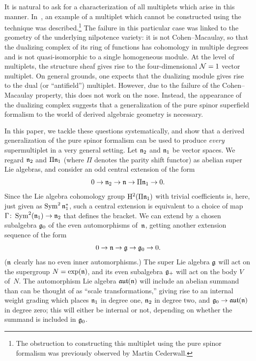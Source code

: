 \documentclass[pdftex]{sigma}
\numberwithin{equation}{section}
\def\lie#1{\ensuremath{\mathfrak{#1}}}
\def\aut{\ensuremath{\lie{aut}}}
\DeclareMathOperator{\Sym}{Sym}
\begin{document}
It is natural to ask for a characterization of all multiplets which arise in this manner.
In~\cite{perspectives}, an example of a multiplet which cannot be constructed using the technique was described.\footnote{The obstruction to constructing this multiplet using the pure spinor formalism was previously observed by Martin Cederwall.} The failure in this particular case was linked to the geometry of the underlying nilpotence variety: it is not Cohen--Macaulay, so that the dualizing complex of its ring of functions has cohomology in multiple degrees and is not quasi-isomorphic to a single homogeneous module. At the level of multiplets, the structure sheaf gives rise to the four-dimensional $\mathcal N = 1$ vector multiplet. On general grounds, one expects that the dualizing module gives rise to
the dual (or ``antifield'') multiplet.
However, due to the failure of the Cohen--Macaulay property, this does not work on the nose. Instead, the appearance of the dualizing complex suggests that a generalization of the pure spinor superfield formalism to the world of derived algebraic geometry is necessary.

In this paper, we tackle these questions systematically, and show that a derived generalization of the pure spinor formalism can be used to produce \emph{every} supermultiplet in a very general setting.
Let $\mathfrak n_2$ and $\mathfrak n_1$ be vector spaces. We regard $\mathfrak n_2$ and $\Pi \mathfrak n_1$ (where $\Pi$ denotes the parity shift functor) as abelian super Lie algebras, and consider an odd central extension of the form
\begin{equation} \label{eq:ext1}
	0 \to \mathfrak n_2 \to \mathfrak n \to \Pi\mathfrak n_1 \to 0.
\end{equation}
Since the Lie algebra cohomology group $\mathrm H^2(\Pi \mathfrak n_1)$ with trivial coefficients is, here, just given as $\Sym^2 \fn_1^*$, such a central extension is equivalent to a choice of map $\Gamma \colon \Sym^2(\fn_1) \to \fn_2$ that defines the bracket.
We can extend by a chosen subalgebra $\mathfrak g_0$ of the even automorphisms of~$\mathfrak n$, getting another extension sequence of the form
\begin{equation*}
	0 \to \mathfrak n \to \mathfrak g \to \mathfrak g_0 \to 0.
\end{equation*}
($\mathfrak n$ clearly has no even inner automorphisms.) The super Lie algebra $\mathfrak g$ will act on the supergroup $N = \exp(\mathfrak n)$, and its even subalgebra $\mathfrak g_+$ will act on the body $V$ of~$N$. The automorphism Lie algebra $\aut(\fn)$ will include an abelian summand than can be thought of as ``scale transformations,'' giving rise to an internal weight grading which places $\mathfrak n_1$ in degree one, $\mathfrak n_2$ in degree two, and $\fg_0 \to \aut(\fn)$ in degree zero; this will either be internal or not, depending on whether the summand is included in $\mathfrak g_0$.
\end{document}
